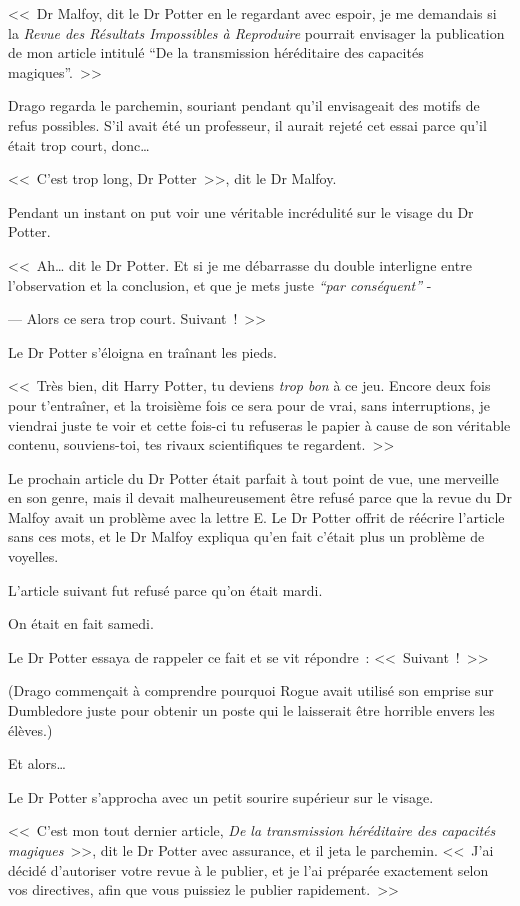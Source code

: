 <<~Dr Malfoy, dit le Dr Potter en le regardant avec espoir, je me demandais si la \emph{Revue des Résultats Impossibles à Reproduire} pourrait envisager la publication de mon article intitulé “De la transmission héréditaire des capacités magiques”.~>>

Drago regarda le parchemin, souriant pendant qu'il envisageait des motifs de refus possibles. S'il avait été un professeur, il aurait rejeté cet essai parce qu'il était trop court, donc…

<<~C'est trop long, Dr Potter~>>, dit le Dr Malfoy.

Pendant un instant on put voir une véritable incrédulité sur le visage du Dr Potter.

<<~Ah… dit le Dr Potter. Et si je me débarrasse du double interligne entre l'observation et la conclusion, et que je mets juste \emph{“par conséquent”} -

--- Alors ce sera trop court. Suivant~!~>>

Le Dr Potter s'éloigna en traînant les pieds.

<<~Très bien, dit Harry Potter, tu deviens \emph{trop bon} à ce jeu. Encore deux fois pour t'entraîner, et la troisième fois ce sera pour de vrai, sans interruptions, je viendrai juste te voir et cette fois-ci tu refuseras le papier à cause de son véritable contenu, souviens-toi, tes rivaux scientifiques te regardent.~>>

Le prochain article du Dr Potter était parfait à tout point de vue, une merveille en son genre, mais il devait malheureusement être refusé parce que la revue du Dr Malfoy avait un problème avec la lettre E\@. Le Dr Potter offrit de réécrire l'article sans ces mots, et le Dr Malfoy expliqua qu'en fait c'était plus un problème de voyelles.

L'article suivant fut refusé parce qu'on était mardi.

On était en fait samedi.

Le Dr Potter essaya de rappeler ce fait et se vit répondre~: <<~Suivant~!~>>

(Drago commençait à comprendre pourquoi Rogue avait utilisé son emprise sur Dumbledore juste pour obtenir un poste qui le laisserait être horrible envers les élèves.)

Et alors…

Le Dr Potter s'approcha avec un petit sourire supérieur sur le visage.

<<~C'est mon tout dernier article, \emph{De la transmission héréditaire des capacités magiques}~>>, dit le Dr Potter avec assurance, et il jeta le parchemin. <<~J'ai décidé d'autoriser votre revue à le publier, et je l'ai préparée exactement selon vos directives, afin que vous puissiez le publier rapidement.~>>

